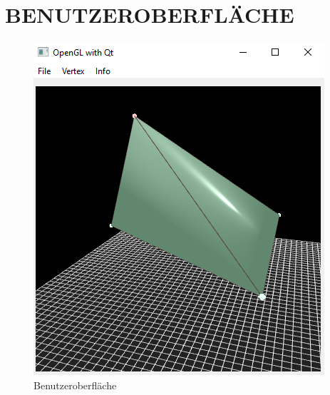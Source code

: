 	
	\section{\Large BENUTZEROBERFLÄCHE}

	\begin{figure}[H]
	\centering
	\includegraphics[width=0.7\linewidth]{GUI.png}
	\caption{Benutzeroberfläche}
	\label{fig9}
	\end{figure}
	

	

		